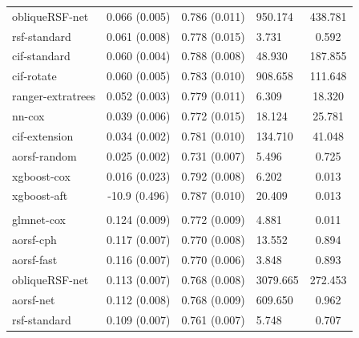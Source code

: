 \documentclass[twoside,11pt]{article}\usepackage[]{graphicx}\usepackage[]{xcolor}
\newenvironment{knitrout}{}{} %
\begin{document}
\begin{knitrout}
\begin{longtable}[t]{lcclc}
\hspace{1em}obliqueRSF-net & 0.066 (0.005) & 0.786 (0.011) & 950.174 & 438.781\\
\hspace{1em}rsf-standard & 0.061 (0.008) & 0.778 (0.015) & 3.731 & 0.592\\
\hspace{1em}cif-standard & 0.060 (0.004) & 0.788 (0.008) & 48.930 & 187.855\\
\hspace{1em}cif-rotate & 0.060 (0.005) & 0.783 (0.010) & 908.658 & 111.648\\
\hspace{1em}ranger-extratrees & 0.052 (0.003) & 0.779 (0.011) & 6.309 & 18.320\\
\hspace{1em}nn-cox & 0.039 (0.006) & 0.772 (0.015) & 18.124 & 25.781\\
\hspace{1em}cif-extension & 0.034 (0.002) & 0.781 (0.010) & 134.710 & 41.048\\
\hspace{1em}aorsf-random & 0.025 (0.002) & 0.731 (0.007) & 5.496 & 0.725\\
\hspace{1em}xgboost-cox & 0.016 (0.023) & 0.792 (0.008) & 6.202 & 0.013\\
\hspace{1em}xgboost-aft & -10.9 (0.496) & 0.787 (0.010) & 20.409 & 0.013\\
\addlinespace[0.3em]
\hline
\multicolumn{5}{l}{\textit{\textbf{SPRINT; death, n = 9361, p = 174}}}\\
\hline
\hspace{1em}glmnet-cox & 0.124 (0.009) & 0.772 (0.009) & 4.881 & 0.011\\
\hspace{1em}aorsf-cph & 0.117 (0.007) & 0.770 (0.008) & 13.552 & 0.894\\
\hspace{1em}aorsf-fast & 0.116 (0.007) & 0.770 (0.006) & 3.848 & 0.893\\
\hspace{1em}obliqueRSF-net & 0.113 (0.007) & 0.768 (0.008) & 3079.665 & 272.453\\
\hspace{1em}aorsf-net & 0.112 (0.008) & 0.768 (0.009) & 609.650 & 0.962\\
\hspace{1em}rsf-standard & 0.109 (0.007) & 0.761 (0.007) & 5.748 & 0.707\\

\end{longtable}
\end{knitrout}
\end{document}
